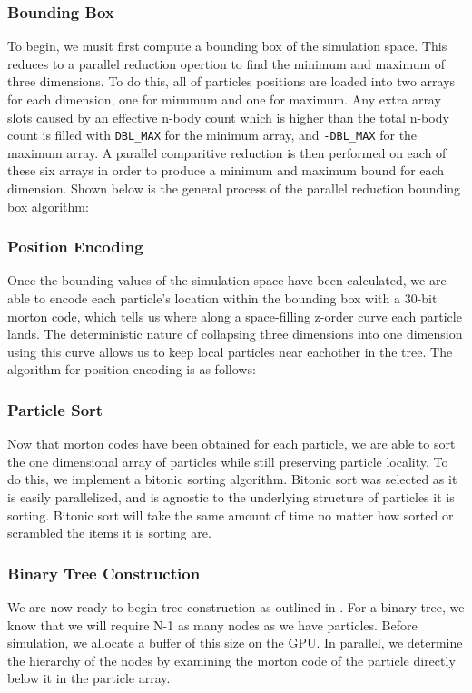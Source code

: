 \documentclass{thesis}
\begin{document}
\subsubsection{Bounding Box}
To begin, we musit first compute a bounding box of the simulation space. This reduces to a parallel reduction opertion to find the minimum and maximum of three dimensions. To do this, all of particles positions are loaded into two arrays for each dimension, one for minumum and one for maximum. Any extra array slots caused by an effective n-body count which is higher than the total n-body count is filled with \verb|DBL_MAX| for the minimum array, and \verb|-DBL_MAX| for the maximum array. A parallel comparitive reduction is then performed on each of these six arrays in order to produce a minimum and maximum bound for each dimension. Shown below is the general process of the parallel reduction bounding box algorithm:
\subsubsection{Position Encoding}
Once the bounding values of the simulation space have been calculated, we are able to encode each particle's location within the bounding box with a 30-bit morton code, which tells us where along a space-filling z-order curve each particle lands. The deterministic nature of collapsing three dimensions into one dimension using this curve allows us to keep local particles near eachother in the tree. The algorithm for position encoding is as follows:
\subsubsection{Particle Sort}
Now that morton codes have been obtained for each particle, we are able to sort the one dimensional array of particles while still preserving particle locality. To do this, we implement a bitonic sorting algorithm. Bitonic sort was selected as it is easily parallelized, and is agnostic to the underlying structure of particles it is sorting. Bitonic sort will take the same amount of time no matter how sorted or scrambled the items it is sorting are.
\subsubsection{Binary Tree Construction}
We are now ready to begin tree construction as outlined in \cite{Karas:2012}. For a binary tree, we know that we will require N-1 as many nodes as we have particles. Before simulation, we allocate a buffer of this size on the GPU. In parallel, we determine the hierarchy of the nodes by examining the morton code of the particle directly below it in the particle array. 
\end{document}
